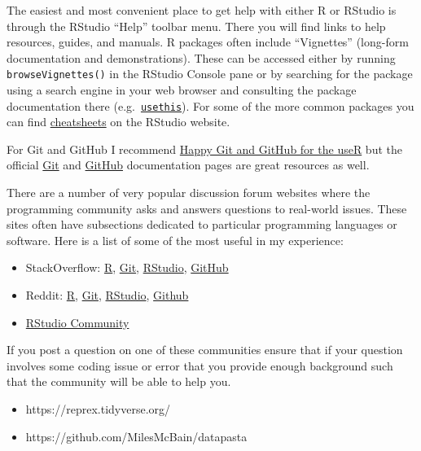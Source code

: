 \documentclass[
  letterpaper,
]{latex/krantz}
\providecommand{\tightlist}{%
  \setlength{\itemsep}{0pt}\setlength{\parskip}{0pt}}\usepackage{longtable,booktabs,array}
\begin{document}
The easiest and most convenient place to get help with either R or
RStudio is through the RStudio ``Help'' toolbar menu. There you will
find links to help resources, guides, and manuals. R packages often
include ``Vignettes'' (long-form documentation and demonstrations).
These can be accessed either by running \texttt{browseVignettes()} in
the RStudio Console pane or by searching for the package using a search
engine in your web browser and consulting the package documentation
there (e.g.~\href{https://usethis.r-lib.org/}{\texttt{usethis}}). For
some of the more common packages you can find
\href{https://www.rstudio.com/resources/cheatsheets/}{cheatsheets} on
the RStudio website.

For Git and GitHub I recommend \href{https://happygitwithr.com/}{Happy
Git and GitHub for the useR} but the official
\href{https://git-scm.com/doc}{Git} and
\href{https://docs.github.com/en}{GitHub} documentation pages are great
resources as well.

There are a number of very popular discussion forum websites where the
programming community asks and answers questions to real-world issues.
These sites often have subsections dedicated to particular programming
languages or software. Here is a list of some of the most useful in my
experience:

\begin{itemize}
\tightlist
\item
  StackOverflow: \href{https://stackoverflow.com/questions/tagged/r}{R},
  \href{https://stackoverflow.com/questions/tagged/git}{Git},
  \href{https://stackoverflow.com/questions/tagged/rstudio}{RStudio},
  \href{https://stackoverflow.com/questions/tagged/github}{GitHub}
\item
  Reddit: \href{https://www.reddit.com/r/rstats/}{R},
  \href{https://www.reddit.com/r/git/}{Git},
  \href{https://www.reddit.com/r/RStudio/}{RStudio},
  \href{https://www.reddit.com/r/github/}{Github}
\item
  \href{https://community.rstudio.com/}{RStudio Community}
\end{itemize}

If you post a question on one of these communities ensure that if your
question involves some coding issue or error that you provide enough
background such that the community will be able to help you.

\begin{itemize}
\item
  https://reprex.tidyverse.org/
\item
  https://github.com/MilesMcBain/datapasta
\end{itemize}
\end{document}
